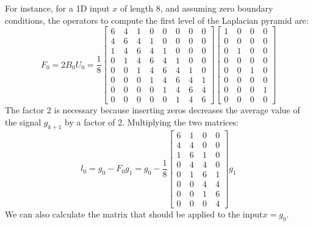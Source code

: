 For instance, for a 1D input $x$ of length 8, and assuming zero boundary conditions, the operators to compute the first level of the Laplacian pyramid are:
\begin{equation}
F_0 =  2 B_0 U_0 =
 \frac{1}{8}
 \begin{bmatrix}
  6 ~& 4 ~& 1 ~& 0 ~& 0 ~& 0 ~& 0 ~& 0 \\
  4 ~& 6 ~& 4 ~& 1 ~& 0 ~& 0 ~& 0 ~& 0 \\
  1 ~& 4 ~& 6 ~& 4 ~& 1 ~& 0 ~& 0 ~& 0 \\
  0 ~& 1 ~& 4 ~& 6 ~& 4 ~& 1 ~& 0 ~& 0 \\
  0 ~& 0 ~& 1 ~& 4 ~& 6 ~& 4 ~& 1 ~& 0 \\
  0 ~& 0 ~& 0 ~& 1 ~& 4 ~& 6 ~& 4 ~& 1 \\
  0 ~& 0 ~& 0 ~& 0 ~& 1 ~& 4 ~& 6 ~& 4 \\
  0 ~& 0 ~& 0 ~& 0 ~& 0 ~& 1 ~& 4 ~& 6 
\end{bmatrix}
 \begin{bmatrix}
  1 ~& 0 ~& 0  ~& 0\\
  0 ~& 0 ~& 0  ~& 0\\
  0 ~& 1 ~& 0  ~& 0\\
  0 ~& 0 ~& 0  ~& 0\\
  0 ~& 0 ~& 1  ~& 0\\
  0 ~& 0 ~& 0  ~& 0\\
  0 ~& 0 ~& 0  ~& 1\\
  0 ~& 0 ~& 0  ~& 0
\end{bmatrix}
 \end{equation}
The factor 2 is necessary because inserting zeros decreases the average value of the signal $g_{k+1}$ by a factor of 2. Multiplying the two matrices:
\begin{equation}
l_{0} = g_0 - F_0 g_{1} = 
 g_0 - \frac{1}{8}
 \begin{bmatrix}
  6 ~& 1 ~& 0  ~& 0\\
  4 ~& 4 ~& 0  ~& 0\\
  1 ~& 6 ~& 1  ~& 0\\
  0 ~& 4 ~& 4  ~& 0\\
  0 ~& 1 ~& 6  ~& 1\\
  0 ~& 0 ~& 4  ~& 4\\
  0 ~& 0 ~& 1  ~& 6\\
  0 ~& 0 ~& 0  ~& 4
\end{bmatrix}
 g_{1}
 \end{equation}
We can also calculate the matrix that should be applied to the input$x=g_0$.
